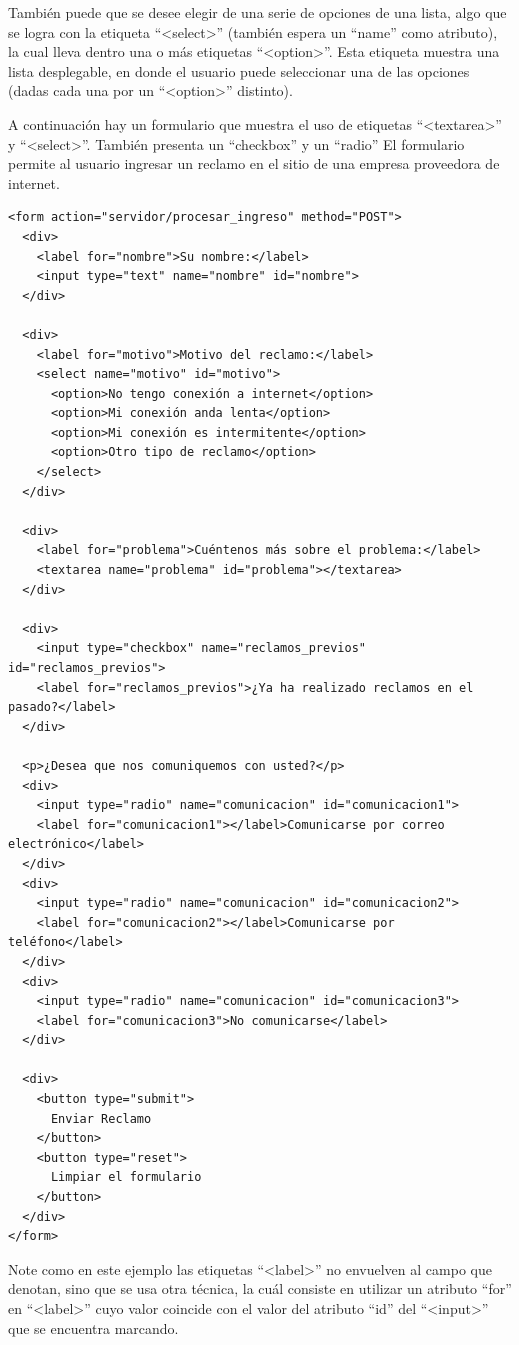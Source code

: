 También puede que se desee elegir de una serie de opciones de una lista, algo
que se logra con la etiqueta ``<select>'' (también espera un ``name'' como
atributo), la cual lleva dentro una o más etiquetas ``<option>''. Esta etiqueta
muestra una lista desplegable, en donde el usuario puede seleccionar una de las
opciones (dadas cada una por un ``<option>'' distinto).

A continuación hay un formulario que muestra el uso de etiquetas ``<textarea>'' y
``<select>''. También presenta un ``checkbox'' y un ``radio'' El formulario
permite al usuario ingresar un reclamo en el sitio
de una empresa proveedora de internet.

\begin{lstlisting}[language=XHTML]
<form action="servidor/procesar_ingreso" method="POST">
  <div>
    <label for="nombre">Su nombre:</label>
    <input type="text" name="nombre" id="nombre">
  </div>

  <div>
    <label for="motivo">Motivo del reclamo:</label>
    <select name="motivo" id="motivo">
      <option>No tengo conexión a internet</option>
      <option>Mi conexión anda lenta</option>
      <option>Mi conexión es intermitente</option>
      <option>Otro tipo de reclamo</option>
    </select>
  </div>

  <div>
    <label for="problema">Cuéntenos más sobre el problema:</label>
    <textarea name="problema" id="problema"></textarea>
  </div>

  <div>
    <input type="checkbox" name="reclamos_previos" id="reclamos_previos">
    <label for="reclamos_previos">¿Ya ha realizado reclamos en el pasado?</label>
  </div>

  <p>¿Desea que nos comuniquemos con usted?</p>
  <div>
    <input type="radio" name="comunicacion" id="comunicacion1">
    <label for="comunicacion1"></label>Comunicarse por correo electrónico</label>
  </div>
  <div>
    <input type="radio" name="comunicacion" id="comunicacion2">
    <label for="comunicacion2"></label>Comunicarse por teléfono</label>
  </div>
  <div>
    <input type="radio" name="comunicacion" id="comunicacion3">
    <label for="comunicacion3">No comunicarse</label>
  </div>

  <div>
    <button type="submit">
      Enviar Reclamo
    </button>
    <button type="reset">
      Limpiar el formulario
    </button>
  </div>
</form>
\end{lstlisting}

Note como en este ejemplo las etiquetas ``<label>'' no envuelven al campo
que denotan, sino que se usa otra técnica, la cuál consiste en utilizar
un atributo ``for'' en ``<label>'' cuyo valor coincide con el valor del
atributo ``id'' del ``<input>'' que se encuentra marcando.

